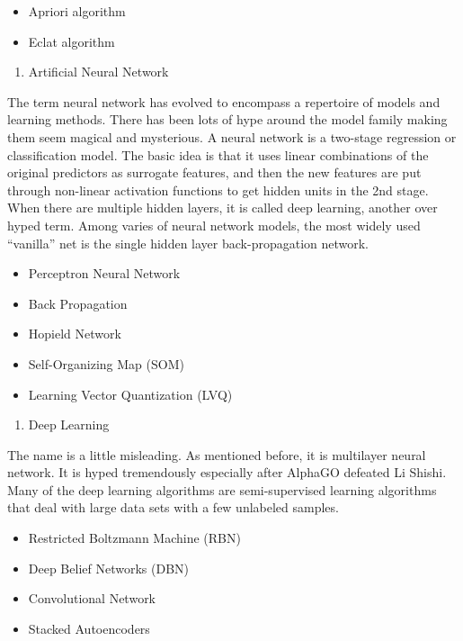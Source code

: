 \documentclass[
]{article}
\providecommand{\tightlist}{%
  \setlength{\itemsep}{0pt}\setlength{\parskip}{0pt}}
\begin{document}
\begin{itemize}
\tightlist
\item
  Apriori algorithm
\item
  Eclat algorithm
\end{itemize}

\begin{enumerate}
\def\labelenumi{\arabic{enumi}.}
\setcounter{enumi}{9}
\tightlist
\item
  Artificial Neural Network
\end{enumerate}

The term neural network has evolved to encompass a repertoire of models
and learning methods. There has been lots of hype around the model
family making them seem magical and mysterious. A neural network is a
two-stage regression or classification model. The basic idea is that it
uses linear combinations of the original predictors as surrogate
features, and then the new features are put through non-linear
activation functions to get hidden units in the 2nd stage. When there
are multiple hidden layers, it is called deep learning, another over
hyped term. Among varies of neural network models, the most widely used
``vanilla'' net is the single hidden layer back-propagation network.

\begin{itemize}
\tightlist
\item
  Perceptron Neural Network
\item
  Back Propagation
\item
  Hopield Network
\item
  Self-Organizing Map (SOM)
\item
  Learning Vector Quantization (LVQ)
\end{itemize}

\begin{enumerate}
\def\labelenumi{\arabic{enumi}.}
\setcounter{enumi}{10}
\tightlist
\item
  Deep Learning
\end{enumerate}

The name is a little misleading. As mentioned before, it is multilayer
neural network. It is hyped tremendously especially after AlphaGO
defeated Li Shishi. Many of the deep learning algorithms are
semi-supervised learning algorithms that deal with large data sets with
a few unlabeled samples.

\begin{itemize}
\tightlist
\item
  Restricted Boltzmann Machine (RBN)
\item
  Deep Belief Networks (DBN)
\item
  Convolutional Network
\item
  Stacked Autoencoders
\end{itemize}
\end{document}

